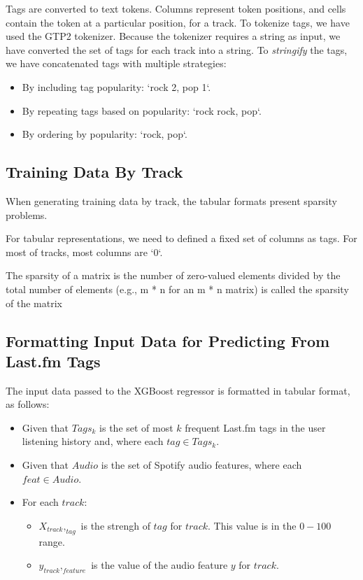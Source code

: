 \documentclass[sn-mathphys]{sn-jnl}%
\theoremstyle{thmstyleone}%
\theoremstyle{thmstyletwo}%
\theoremstyle{thmstylethree}%
\begin{document}
Tags are converted to text tokens. Columns represent token positions, and cells contain the token at a particular position, for a track.
To tokenize tags, we have used the GTP2 tokenizer.
Because the tokenizer requires a string as input, we have converted the set of tags for each track into a string.
To \emph{stringify} the tags, we have concatenated tags with multiple strategies:

\begin{itemize}
      \item By including tag popularity: `rock 2, pop 1`.
      \item By repeating tags based on popularity: `rock rock, pop`.
      \item By ordering by popularity: `rock, pop`.
\end{itemize}

\subsection{Training Data By Track}

When generating training data by track, the tabular formats present sparsity problems.

For tabular representations, we need to defined a fixed set of columns as tags.
For most of tracks, most columns are `0`.

The sparsity of a matrix is the number of zero-valued elements divided by the total number of elements
(e.g., m * n for an m * n matrix) is called the sparsity of the matrix












\subsection{Formatting Input Data for Predicting From Last.fm Tags}

The input data passed to the XGBoost regressor is formatted in tabular format, as follows:

\begin{itemize}
      \item Given that $Tags_{k}$ is the set of most $k$ frequent Last.fm tags in the user listening history
            and, where each $tag \in Tags_{k}$.
      \item Given that $Audio$ is the set of Spotify audio features, where each $feat \in Audio$.
      \item For each $track$:
      \begin{itemize}
            \item $X_{track},_{tag}$ is the strengh of $tag$ for $track$. This value is in the $0-100$ range.
            \item $y_{track},_{feature}$ is the value of the audio feature $y$ for $track$.
      \end{itemize}
\end{itemize}
\end{document}
